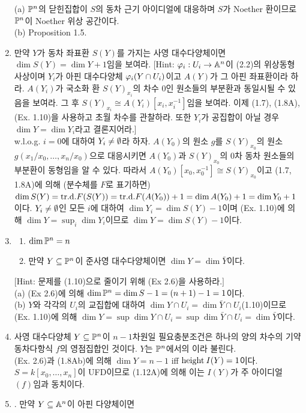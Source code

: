 \begin{enumerate}[label=\tb{2.\arabic*.},itemindent=0mm,itemsep=4mm]
\begin{enumerate}[label=(\alph*)]
		\end{enumerate}
		\sol (a) $\mathbb{P}^n$의 닫힌집합이 $S$의 동차 근기 아이디얼에 대응하며 $S$가 Noether 환이므로 $\mathbb{P}^n$이 Noether 위상 공간이다.\\
		(b) Proposition 1.5.
		\item 만약 $Y$가 동차 좌표환 $S(Y)$를 가지는 사영 대수다양체이면 $\dim S(Y)=\dim Y+1$임을 보여라.
		[Hint: $\varphi_i:U_i\rightarrow\mathbb{A}^n$이 (2.2)의 위상동형사상이며
		$Y_i$가 아핀 대수다양체 $\varphi_i(Y\cap U_i)$이고 $A(Y)$가 그 아핀 좌표환이라 하라.
		$A(Y_i)$가 국소화 환 $S(Y)_{x_i}$의 차수 0인 원소들의 부분환과 동일시될 수 있음을 보여라.
		그 후 $S(Y)_{x_i}\cong A(Y_i)[x_i,x_i^{-1}]$임을 보여라.
		이제 (1.7), (1.8A), (Ex. 1.10)을 사용하고 초월 차수를 관찰하라.
		또한 $Y_i$가 공집합이 아닐 경우 $\dim Y=\dim Y_i$라고 결론지어라.]\\
		\sol w.l.o.g. $i=0$에 대하여 $Y_i\ne\emptyset$라 하자.
		$A(Y_0)$의 원소 $g$를 $S(Y)_{x_0}$의 원소 $g(x_1/x_0,\ldots,x_n/x_0)$으로 대응시키면
		$A(Y_0)$과 $S(Y)_{x_0}$의 0차 동차 원소들의 부분환이 동형임을 알 수 있다.
		따라서 $A(Y_0)[x_0,x_0^{-1}]\cong S(Y)_{x_0}$이고 (1.7, 1.8A)에 의해 (분수체를 $F$로 표기하면)
		$\dim S(Y)=\mathrm{tr.d.} F(S(Y))=\mathrm{tr.d.} F(A(Y_0))+1=\dim A(Y_0)+1=\dim Y_0+1$이다.
		$Y_i\ne\emptyset$인 모든 $i$에 대하여 $\dim Y_i=\dim S(Y)-1$이며
		(Ex. 1.10)에 의해 $\dim Y=\sup_i\dim Y_i$이므로 $\dim Y=\dim S(Y)-1$이다.
		\item \begin{enumerate}[label=(\alph*)]
			\item $\dim\mathbb{P}^n=n$
			\item 만약 $Y\subseteq\mathbb{P}^n$이 준사영 대수다양체이면 $\dim Y=\dim\bar Y$이다.
		\end{enumerate}
		$[$Hint: 문제를 (1.10)으로 줄이기 위해 (Ex 2.6)을 사용하라.$]$\\
		\sol (a) (Ex 2.6)에 의해 $\dim\mathbb{P}^n=\dim S-1=(n+1)-1=1$이다.\\
		(b) $Y$와 각각의 $U_i$의 교집합에 대하여 $\dim Y\cap U_i=\dim\bar Y\cap U_i$(1.10)이므로
		(Ex. 1.10)에 의해 $\dim Y=\sup\dim Y\cap U_i=\sup\dim\bar Y\cap U_i=\dim\bar Y$이다.
		\item 사영 대수다양체 $Y\subseteq\mathbb{P}^n$이 $n-1$차원일 필요충분조건은 하나의 양의 차수의 기약 동차다항식 $f$의 영점집합인 것이다.
		$Y$는 $\mathbb{P}^n$에서의 이라 불린다.\\
		\sol (Ex. 2.6)과 (1.8Ab)에 의해 $\dim Y=n-1$ iff $\mathrm{height}\:I(Y)=1$이다.
		$S=k[x_0,\ldots,x_n]$이 UFD이므로 (1.12A)에 의해 이는 $I(Y)$가 주 아이디얼 $(f)$임과 동치이다.
		\item {}. 만약 $Y\subseteq\mathbb{A}^n$이 아핀 다양체이면

\end{enumerate}
